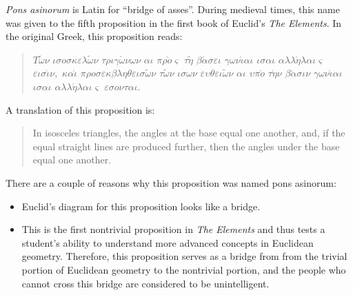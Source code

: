 \documentclass[12pt]{article}
\begin{document}

\emph{Pons asinorum} is Latin for ``bridge of asses''.  During medieval times, this name was given to the fifth proposition in the first book of Euclid's \emph{The Elements}.  In the original Greek, this proposition reads:

\begin{quote}
$T\tilde{\omega}\nu$ $\iota\sigma o\sigma\kappa\varepsilon\lambda\tilde{\omega}\nu$ $\tau\rho\iota\gamma\acute{\omega}\nu\omega\nu$ $\alpha\iota$ $\pi\rho\grave{o}\varsigma$ $\tau\tilde{\eta}$ $\beta\acute{\alpha}\sigma\varepsilon\iota$ $\gamma\omega\nu\acute{\iota}\alpha\iota$ $\iota\sigma\alpha\iota$ $\alpha\lambda\lambda\acute{\eta}\lambda\alpha\iota\varsigma$ $\varepsilon\iota\sigma\acute{\iota}\nu,$ $\kappa\alpha\grave{\iota}$ $\pi\rho o\sigma\varepsilon\kappa\beta\lambda\eta\theta\varepsilon\iota\sigma\tilde{\omega}\nu$ $\tau\tilde{\omega}\nu$ $\iota\sigma\omega\nu$ $\varepsilon\upsilon\theta\varepsilon\iota\tilde{\omega}\nu$ $\alpha\iota$ $\upsilon\pi\grave{o}$ $\tau\grave{\eta}\nu$ $\beta\acute{\alpha}\sigma\iota\nu$ $\gamma\omega\nu\acute{\iota}\alpha\iota$ $\iota\sigma\alpha\iota$ $\alpha\lambda\lambda\acute{\eta}\lambda\alpha\iota\varsigma$ $\varepsilon\sigma o\nu\tau\alpha\iota.$
\end{quote}

A translation of this proposition is:

\begin{quote}
In isosceles triangles, the angles at the base equal one another, and, if the equal straight lines are produced further, then the angles under the base equal one another.
\end{quote}

There are a couple of reasons why this proposition was named pons asinorum:

\begin{itemize}
\item Euclid's diagram for this proposition looks like a bridge.
\item This is the first nontrivial proposition in \emph{The Elements} and thus tests a student's ability to understand more advanced concepts in Euclidean geometry.  Therefore, this proposition serves as a bridge from from the trivial portion of Euclidean geometry to the nontrivial portion, and the people who cannot cross this bridge are considered to be unintelligent.
\end{itemize}
\end{document}
